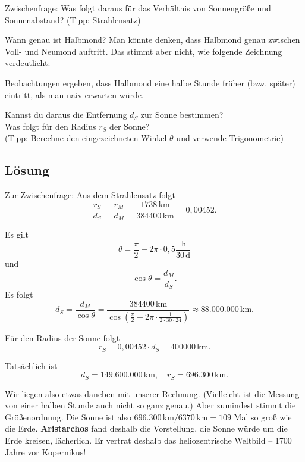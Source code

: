 \documentclass{scrartcl}
\newcommand{\RM}{r_M} %
\newcommand{\RS}{r_S} %
\newcommand{\DM}{d_M} %
\newcommand{\DS}{d_S} %
\newcommand{\person}[1]{\textbf{#1}} %
\newcommand{\km}{\,\mathrm{km}} %
\newcommand{\hour}{\,\mathrm{h}} %
\newcommand{\days}{\,\mathrm{d}} %
\begin{document}
  Zwischenfrage: Was folgt daraus für das Verhältnis von Sonnengröße und Sonnenabstand? (Tipp: Strahlensatz)

  Wann genau ist Halbmond? Man könnte denken, dass Halbmond genau zwischen Voll- und Neumond auftritt. Das stimmt aber nicht, wie folgende Zeichnung verdeutlicht:

  \vspace{4cm}

  Beobachtungen ergeben, dass Halbmond eine halbe Stunde früher (bzw. später) eintritt, als man naiv erwarten würde.

  Kannst du daraus die Entfernung $\DS$ zur Sonne bestimmen?\\
  Was folgt für den Radius $\RS$ der Sonne? \\
  (Tipp: Berechne den eingezeichneten Winkel $\theta$ und verwende Trigonometrie)

  \newpage
  \subsection{Lösung}

  Zur Zwischenfrage: Aus dem Strahlensatz folgt
  \[ \frac{\RS}{\DS} = \frac{\RM}{\DM} = \frac{1738 \km}{384400 \km} = 0,00452. \]

  Es gilt
  \[ \theta = \frac{\pi}{2} - 2\pi \cdot 0,5 \frac{\hour}{30 \days} \]
  und
  \[ \cos \theta = \frac{\DM}{\DS}. \]
  Es folgt
  \[ \DS = \frac{\DM}{\cos \theta} = \frac{384400 \km}{\cos(\frac{\pi}{2} - 2\pi \cdot \frac{1}{2 \cdot 30 \cdot 24})} \approx 88.000.000 \km. \]

  Für den Radius der Sonne folgt
  \[ \RS = 0,00452 \cdot \DS = 400000 \km. \]

  Tatsächlich ist
  \[
    \DS = 149.600.000 \km, \quad
    \RS = 696.300 \km.
  \]

  Wir liegen also etwas daneben mit unserer Rechnung. (Vielleicht ist die Messung von einer halben Stunde auch nicht so ganz genau.) Aber zumindest stimmt die Größenordnung. Die Sonne ist also $696.300 \km / 6370 \km = 109$ Mal so groß wie die Erde.
  \person{Aristarchos} fand deshalb die Vorstellung, die Sonne würde um die Erde kreisen, lächerlich. Er vertrat deshalb das heliozentrische Weltbild -- 1700 Jahre vor Kopernikus!

\end{document}
